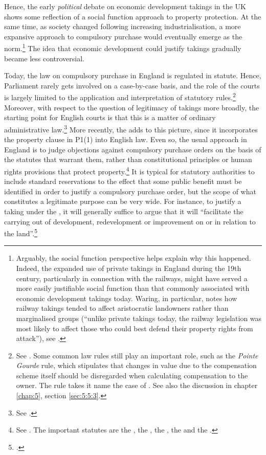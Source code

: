 Hence, the early {\it political} debate on economic development takings in the UK shows some reflection of a social function approach to property protection. At the same time, as society changed following increasing industrialisation, a more expansive approach to compulsory purchase would eventually emerge as the norm.\footnote{Arguably, the social function perspective helps explain why this happened. Indeed, the expanded use of private takings in England during the 19th century, particularly in connection with the railways, might have served a more easily justifiable social function than that commonly associated with economic development takings today. Waring, in particular, notes how railway takings tended to affect aristocratic landowners rather than marginalised groups (``unlike private takings today, the railway legislation was most likely to affect those who could best defend their property rights from attack''), see \cite[111]{waring09}.} The idea that economic development could justify takings gradually became less controversial.

Today, the law on compulsory purchase in England is regulated in statute. Hence, Parliament rarely gets involved on a case-by-case basis, and the role of the courts is largely limited to the application and interpretation of statutory rules.\footnote{See \cite[116-121]{waring09}. Some common law rules still play an important role, such as the {\it Pointe Gourde} rule, which stipulates that changes in value due to the compensation scheme itself should be disregarded when calculating compensation to the owner. The rule takes it name the case of \cite{gourde47}. See also the discussion in chapter \ref{chap:5}, section \ref{sec:5:5:3}.} Moreover, with respect to the question of legitimacy of takings more broadly, the starting point for English courts is that this is a matter of ordinary administrative law.\footnote{See \cite{taggart98}.} More recently, the \cite{hra98} adds to this picture, since it incorporates the property clause in P1(1) into English law. Even so, the usual approach in England is to judge objections against compulsory purchase orders on the basis of the statutes that warrant them, rather than constitutional principles or human rights provisions that protect property.\footnote{See \cite[121-132]{waring09}. The important statutes are the \cite{ala81}, the \cite{lca61}, the \cite{cpa65}, the \cite{tcpa90} and the \cite{pcpa04}.} It is typical for statutory authorities to include standard reservations to the effect that some public benefit must be identified in order to justify a compulsory purchase order, but the scope of what constitutes a legitimate purpose can be very wide. For instance, to justify a taking under the \cite{tcpa90}, it will generally suffice to argue that it will ``facilitate the carrying out of development, redevelopment or improvement on or in relation to the land''.\dni\footcite[226]{tcpa90}

